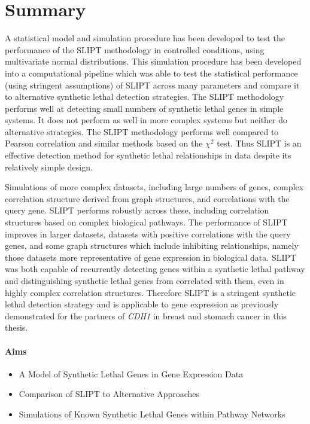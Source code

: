 \section{Summary}

A statistical model and simulation procedure has been developed to test the performance of the \gls{SLIPT} methodology in controlled conditions, using multivariate normal distributions. This simulation procedure has been developed into a computational pipeline which was able to test the statistical performance (using stringent assumptions) of \gls{SLIPT} across many parameters and compare it to alternative \gls{synthetic lethal} detection strategies. The \gls{SLIPT} methodology performs well at detecting small numbers of \gls{synthetic lethal} genes in simple systems. It does not perform as well in more complex systems but neither do alternative strategies. The \gls{SLIPT} methodology performs well compared to Pearson correlation and similar methods based on the $\chi^2$ test. Thus \gls{SLIPT} is an effective detection method for \gls{synthetic lethal} relationships in  data despite its relatively simple design.

Simulations of more complex datasets, including large numbers of genes, complex correlation structure derived from \gls{graph} structures, and correlations with the query gene. \gls{SLIPT} performs robustly across these, including correlation structures based on complex biological pathways. The performance of \gls{SLIPT} improves in larger datasets, datasets with positive correlations with the query genes, and some \gls{graph} structures which include inhibiting relationships, namely those datasets more representative of \gls{gene expression} in biological data. \gls{SLIPT} was both capable of recurrently detecting genes within a \gls{synthetic lethal} pathway and distinguishing \gls{synthetic lethal} genes from correlated with them, even in highly complex correlation structures. Therefore \gls{SLIPT} is a stringent \gls{synthetic lethal} detection strategy and is applicable to \gls{gene expression} as previously demonstrated for the partners of \textit{CDH1} in breast and stomach cancer in this thesis.

\clearpage

\iffalse
\paragraph{Aims}

  \begin{itemize}
   \item A Model of Synthetic Lethal Genes in Gene Expression Data
   
   \bigskip
   
   \item Comparison of SLIPT to Alternative Approaches
   
   \bigskip
   
   \item Simulations of Known Synthetic Lethal Genes within Pathway Networks
      
  \end{itemize}

